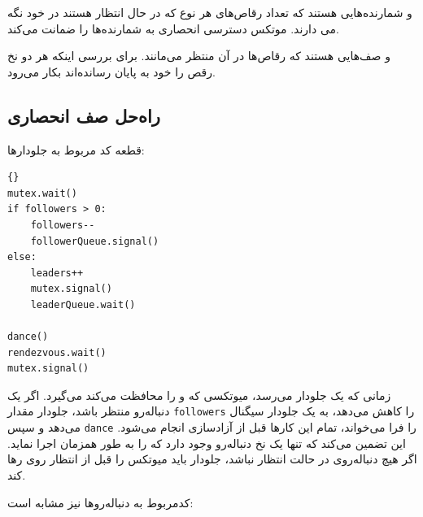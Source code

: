 \documentclass{book}
\newcommand{\clearemptydoublepage}{\newpage\cleardoublepage}
\begin{document}
     و 
    شمارنده‌هایی هستند که تعداد رقاص‌های هر نوع که در حال انتظار هستند در خود نگه می دارند. 
    موتکس دسترسی انحصاری به شمارنده‌ها را ضمانت می‌کند.

     و 
صف‌هایی هستند که رقاص‌ها در آن  منتظر می‌مانند. 
 برای بررسی اینکه هر دو نخ رقص را خود به پایان‌ رسانده‌اند بکار می‌رود. 


\clearemptydoublepage
\subsection {راه‌حل صف انحصاری}

    قطعه کد مربوط به جلو‌دارها:

\begin{latin}
\begin{latin}
\begin{lstlisting}[title=\rl{راه حل صف (جلودارها)}]{}
mutex.wait()
if followers > 0:
    followers--
    followerQueue.signal()
else:
    leaders++
    mutex.signal()
    leaderQueue.wait()    

dance()
rendezvous.wait()
mutex.signal()
\end{lstlisting}
\end{latin}
\end{latin}

    زمانی که یک جلو‌دار می‌رسد، میوتکسی که   و  را محافظت می‌کند می‌گیرد. 
    اگر یک دنباله‌رو منتظر باشد، جلو‌دار مقدار {\tt followers} را کاهش می‌دهد،  به یک جلو‌دار سیگنال می‌دهد و سپس {\tt dance} را فرا می‌خواند، 
    تمام این‌ کارها  قبل از آزادسازی  انجام می‌شود. 
    این تضمین می‌کند که تنها یک نخ دنباله‌رو وجود دارد که  را به طور همزمان اجرا نماید. 
    اگر هیچ دنباله‌روی در حالت انتظار نباشد، جلو‌دار باید میوتکس را قبل از انتظار روی  رها کند. 

    کدمربوط به دنباله‌روها نیز مشابه است:
\end{document}
